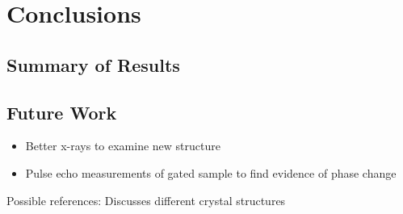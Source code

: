 \chapter{Conclusions}

\section{Summary of Results}

\section{Future Work}
\begin{itemize}
\item Better x-rays to examine new structure
\item Pulse echo measurements of gated sample to find evidence of phase change
\end{itemize}

Possible references:
Discusses different crystal structures